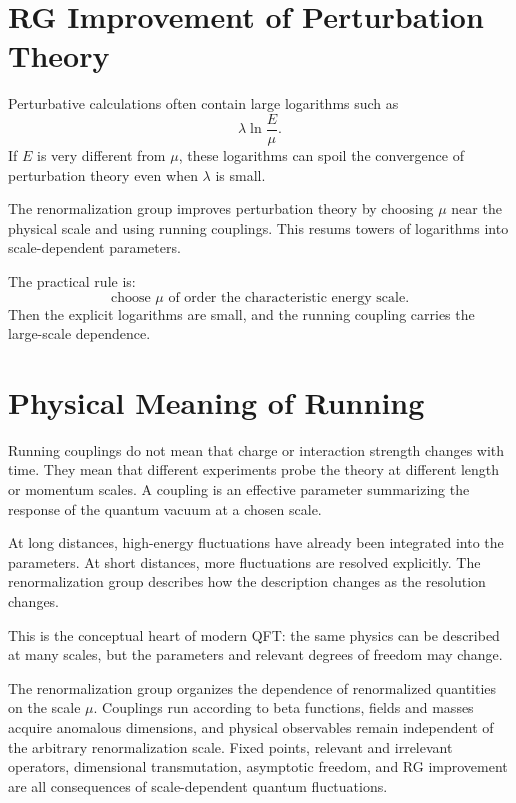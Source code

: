 \section{RG Improvement of Perturbation Theory}

Perturbative calculations often contain large logarithms such as
\[
    \lambda\ln\frac{E}{\mu}.
\]
If \(E\) is very different from \(\mu\), these logarithms can spoil the
convergence of perturbation theory even when \(\lambda\) is small.

The renormalization group improves perturbation theory by choosing \(\mu\) near
the physical scale and using running couplings. This resums towers of logarithms
into scale-dependent parameters.

The practical rule is:
\[
    \text{choose } \mu \text{ of order the characteristic energy scale}.
\]
Then the explicit logarithms are small, and the running coupling carries the
large-scale dependence.

\section{Physical Meaning of Running}

Running couplings do not mean that charge or interaction strength changes with
time. They mean that different experiments probe the theory at different length
or momentum scales. A coupling is an effective parameter summarizing the response
of the quantum vacuum at a chosen scale.

At long distances, high-energy fluctuations have already been integrated into
the parameters. At short distances, more fluctuations are resolved explicitly.
The renormalization group describes how the description changes as the resolution
changes.

This is the conceptual heart of modern QFT: the same physics can be described at
many scales, but the parameters and relevant degrees of freedom may change.

\begin{summarybox}
The renormalization group organizes the dependence of renormalized quantities on
the scale \(\mu\). Couplings run according to beta functions, fields and masses
acquire anomalous dimensions, and physical observables remain independent of the
arbitrary renormalization scale. Fixed points, relevant and irrelevant operators,
dimensional transmutation, asymptotic freedom, and RG improvement are all
consequences of scale-dependent quantum fluctuations.
\end{summarybox}

